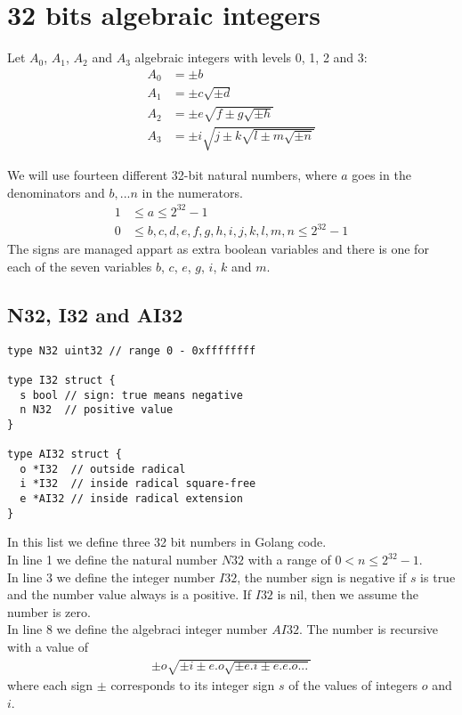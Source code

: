 \documentclass{article}
\begin{document}
\section{32 bits algebraic integers}

Let $A_0$, $A_1$, $A_2$ and $A_3$ algebraic integers with levels 0, 1, 2 and 3:
\begin{align}
A_0 &= \pm b\\
A_1 &= \pm c\sqrt{\pm d}\\
A_2 &= \pm e\sqrt{f \pm g\sqrt{\pm h}}\\
A_3 &= \pm i\sqrt{j \pm k\sqrt{l \pm m\sqrt{\pm n}}}
\end{align}

We will use fourteen different 32-bit natural numbers, where $a$ goes in the denominators and $b,...n$ 
in the numerators.
\begin{align}
1 &\leq a       \leq 2^{32} - 1\\
0 &\leq b,c,d,e,f,g,h,i,j,k,l,m,n \leq 2^{32} - 1
\end{align}
The signs are managed appart as extra boolean variables and there is one for each of the seven variables
$b$, $c$, $e$, $g$, $i$, $k$ and $m$.

\subsection{N32, I32 and AI32}

\setlength{\columnsep}{30pt}
\begin{multicols}{2}
\begin{lstlisting}
type N32 uint32 // range 0 - 0xffffffff

type I32 struct {
  s bool // sign: true means negative
  n N32  // positive value
}

type AI32 struct {
  o *I32  // outside radical
  i *I32  // inside radical square-free
  e *AI32 // inside radical extension
}
\end{lstlisting}
In this list we define three 32 bit numbers in Golang code.\\
In line 1 we define the natural number $N32$ with a range of $0 < n \leq 2^{32} - 1$.\\
In line 3 we define the integer number $I32$, the number sign is negative if $s$ is true 
and the number value always is a positive. If $I32$ is nil, then we assume the number
is zero.\\
In line 8 we define the algebraci integer number $AI32$. The number is recursive with a value of
\begin{align}
\pm o\sqrt{\pm i \pm e.o\sqrt{\pm e.i \pm e.e.o ... }}
\end{align}
where each sign $\pm$ corresponds to its integer sign $s$ of the values of integers $o$ and $i$.
\end{multicols}
\end{document}

